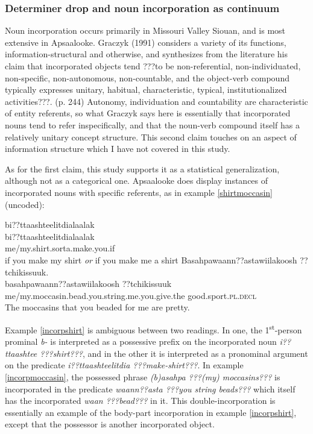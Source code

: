 \documentclass[output=paper]{LSP/langsci}
\begin{document}
\subsubsection{Determiner drop and noun incorporation as continuum}\label{dropincorp}

Noun incorporation occurs primarily in Missouri Valley Siouan, and is most extensive in Apsaalooke. Graczyk (1991) considers a variety of its functions, information-structural and otherwise, and synthesizes from the literature his claim that incorporated objects tend ???to be non-referential, non-individuated, non-specific, non-autonomous, non-countable, and the object-verb compound typically expresses unitary, habitual, characteristic, typical, institutionalized activities???. (p. 244) Autonomy, individuation and countability are characteristic of entity referents, so what Graczyk says here is essentially that incorporated nouns tend to refer inspecifically, and that the noun-verb compound itself has a relatively unitary concept structure. This second claim touches on an aspect of information structure which I have not covered in this study.

As for the first claim, this study supports it as a statistical generalization, although not as a categorical one. Apsaalooke does display instances of incorporated nouns with specific referents, as in example \ref{shirtmoccasin} (uncoded):

\ea\label{shirtmoccasin}
\ea\label{incorpshirt}
bi??ttaashteelitdialaalak\footnotemark\\
\gll	bi??ttaashteelitdialaalak\\
	me/my.shirt.sorta.make.you.if\\
\glt	if you make my shirt \emph{or} if you make me a shirt
\ex\label{incorpmoccasin}
Basahpawaann??astawiilakoosh ??tchikissuuk.\footnotemark\\
\gll	basahpawaann??astawiilakoosh					??tchikissuuk\\
	me/my.moccasin.bead.you.string.me.you.give.the 		good.sport.\textsc{pl.decl}\\
\glt	The moccasins that you beaded for me are pretty. 
\z\z

Example \ref{incorpshirt} is ambiguous between two readings. In one, the 1\textsuperscript{st}-person prominal \emph{b-} is interpreted as a possessive prefix on the incorporated noun  \emph{i??ttaashtee ???shirt???}, and in the other it is interpreted as a pronominal argument on the predicate \emph{i??ttaashteelitdia ???make-shirt???}. In example \ref{incorpmoccasin}, the possessed phrase \emph{(b)asahpa ???(my) moccasins???} is incorporated in the predicate \emph{waann??asta ???you string beads???} which itself has the incorporated \emph{waan ???bead???} in it. This double-incorporation is essentially an example of the body-part incorporation in example \ref{incorpshirt}, except that the possessor is another incorporated object.
\end{document}
